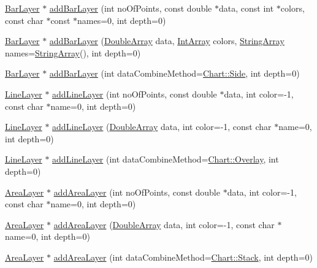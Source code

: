 \begin{DoxyCompactItemize}
\item 
\hyperlink{class_bar_layer}{Bar\+Layer} $\ast$ \hyperlink{class_x_y_chart_a4e8e1491c3e847fab0f69d8296c84a5c}{add\+Bar\+Layer} (int no\+Of\+Points, const double $\ast$data, const int $\ast$colors, const char $\ast$const $\ast$names=0, int depth=0)
\item 
\hyperlink{class_bar_layer}{Bar\+Layer} $\ast$ \hyperlink{class_x_y_chart_a80c3492d60a99e04c11592ed3a0f0b0c}{add\+Bar\+Layer} (\hyperlink{class_double_array}{Double\+Array} data, \hyperlink{class_int_array}{Int\+Array} colors, \hyperlink{class_string_array}{String\+Array} names=\hyperlink{class_string_array}{String\+Array}(), int depth=0)
\item 
\hyperlink{class_bar_layer}{Bar\+Layer} $\ast$ \hyperlink{class_x_y_chart_a9d98cdb1c6a4c83bc5d9ebc697f15450}{add\+Bar\+Layer} (int data\+Combine\+Method=\hyperlink{namespace_chart_af7052bb2fea3a81e43d3812503b3b779a0ede7e5edc987730ca5957389c4e1bbc}{Chart\+::\+Side}, int depth=0)
\item 
\hyperlink{class_line_layer}{Line\+Layer} $\ast$ \hyperlink{class_x_y_chart_aea36113ca810376bd55e2d836b0fe7e5}{add\+Line\+Layer} (int no\+Of\+Points, const double $\ast$data, int color=-\/1, const char $\ast$name=0, int depth=0)
\item 
\hyperlink{class_line_layer}{Line\+Layer} $\ast$ \hyperlink{class_x_y_chart_a7071e482b072e63f9e9004b4d27f39fe}{add\+Line\+Layer} (\hyperlink{class_double_array}{Double\+Array} data, int color=-\/1, const char $\ast$name=0, int depth=0)
\item 
\hyperlink{class_line_layer}{Line\+Layer} $\ast$ \hyperlink{class_x_y_chart_aba9690faaa6eed9b6bc44485dc0b955d}{add\+Line\+Layer} (int data\+Combine\+Method=\hyperlink{namespace_chart_af7052bb2fea3a81e43d3812503b3b779a5586cefdf5069b2df79d2f82fd8666e2}{Chart\+::\+Overlay}, int depth=0)
\item 
\hyperlink{class_area_layer}{Area\+Layer} $\ast$ \hyperlink{class_x_y_chart_afc64c2af1d865e0197f1ec8ee808f33a}{add\+Area\+Layer} (int no\+Of\+Points, const double $\ast$data, int color=-\/1, const char $\ast$name=0, int depth=0)
\item 
\hyperlink{class_area_layer}{Area\+Layer} $\ast$ \hyperlink{class_x_y_chart_a3e5ffb6b63ea2705ac0a84518a3462fd}{add\+Area\+Layer} (\hyperlink{class_double_array}{Double\+Array} data, int color=-\/1, const char $\ast$name=0, int depth=0)
\item 
\hyperlink{class_area_layer}{Area\+Layer} $\ast$ \hyperlink{class_x_y_chart_a06f04cbe6bc527cf1c00a24188cd7dab}{add\+Area\+Layer} (int data\+Combine\+Method=\hyperlink{namespace_chart_af7052bb2fea3a81e43d3812503b3b779aaf9482d7a5b2b98ba5660492356d153a}{Chart\+::\+Stack}, int depth=0)

\end{DoxyCompactItemize}
